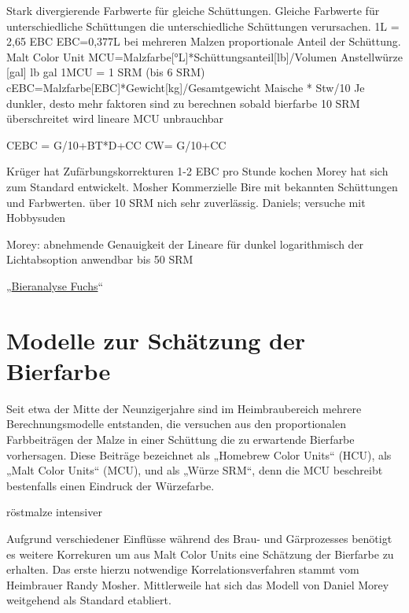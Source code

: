 \documentclass[a4paper,parskip=half]{scrartcl}
\begin{document}
\parencite{KrausWeyermann2021b}
Stark divergierende Farbwerte für gleiche Schüttungen.
Gleiche Farbwerte für unterschiedliche Schüttungen die 
unterschiedliche Schüttungen verursachen.
1L = 2,65 EBC
EBC=0,377L
bei mehreren Malzen proportionale Anteil der Schüttung.
Malt Color Unit MCU=Malzfarbe[°L]*Schüttungsanteil[lb]/Volumen Anstellwürze [gal]
lb gal 
1MCU = 1 SRM (bis 6 SRM)
cEBC=Malzfarbe[EBC]*Gewicht[kg]/Gesamtgewicht Maische * Stw/10 
Je dunkler, desto mehr faktoren sind zu berechnen
sobald bierfarbe 10 SRM überschreitet wird lineare MCU unbrauchbar

CEBC = G/10+BT*D+CC
CW= G/10+CC

Krüger hat Zufärbungskorrekturen
1-2 EBC pro Stunde kochen
Morey hat sich zum Standard entwickelt.
Mosher Kommerzielle Bire mit bekannten Schüttungen und Farbwerten. über 10 SRM nich sehr zuverlässig.
Daniels; versuche mit Hobbysuden

Morey: abnehmende Genauigkeit der Lineare für dunkel logarithmisch der Lichtabsoption
anwendbar bis 50 SRM

„\href{https://bieranalyse.de}{Bieranalyse Fuchs}“

\section*{Modelle zur Schätzung der Bierfarbe}

Seit etwa der Mitte der Neunzigerjahre sind im Heimbraubereich mehrere Berechnungsmodelle entstanden, die versuchen aus den proportionalen Farbbeiträgen der Malze in einer Schüttung die zu erwartende Bierfarbe vorhersagen. Diese Beiträge bezeichnet \textcite[34]{Mosher1994} als „Homebrew Color Units“ (HCU), \textcite[61]{Daniels1996} als „Malt Color Units“ (MCU), und \textcite[10]{Holle2010} als „Würze SRM“, denn die MCU beschreibt bestenfalls einen Eindruck der Würzefarbe.

röstmalze intensiver
\parencite{KrausWeyermann2021c}

Aufgrund verschiedener Einflüsse während des Brau- und Gärprozesses benötigt es weitere Korrekuren um aus Malt Color Units eine Schätzung der Bierfarbe zu erhalten. Das erste hierzu notwendige Korrelationsverfahren stammt vom Heimbrauer Randy Mosher. Mittlerweile hat sich das Modell von Daniel Morey weitgehend als Standard etabliert. \parencite{KrausWeyermann2021b}
\end{document}

